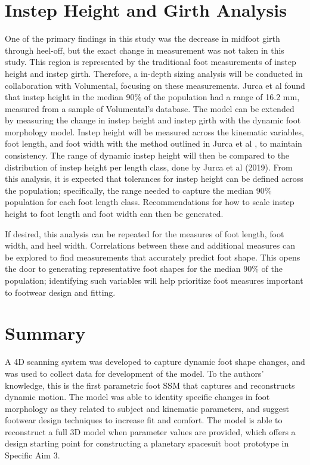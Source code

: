 \documentclass[defaultstyle,11pt]{comps}
\begin{document}
\hypertarget{instep-height-and-girth-analysis}{%
\section{Instep Height and Girth Analysis}\label{instep-height-and-girth-analysis}}

One of the primary findings in this study was the decrease in midfoot girth through heel-off, but the exact change in measurement was not taken in this study.
This region is represented by the traditional foot measurements of instep height and instep girth.
Therefore, a in-depth sizing analysis will be conducted in collaboration with Volumental, focusing on these measurements.
Jurca et al \citep{Jurca2019} found that instep height in the median 90\% of the population had a range of 16.2 mm, measured from a sample of Volumental's database.
The model can be extended by measuring the change in instep height and instep girth with the dynamic foot morphology model.
Instep height will be measured across the kinematic variables, foot length, and foot width with the method outlined in Jurca et al \citep{Jurca2019}, to maintain consistency.
The range of dynamic instep height will then be compared to the distribution of instep height per length class, done by Jurca et al (2019).
From this analysis, it is expected that tolerances for instep height can be defined across the population; specifically, the range needed to capture the median 90\% population for each foot length class.
Recommendations for how to scale instep height to foot length and foot width can then be generated.

If desired, this analysis can be repeated for the measures of foot length, foot width, and heel width. Correlations between these and additional measures can be explored to find measurements that accurately predict foot shape. This opens the door to generating representative foot shapes for the median 90\% of the population; identifying such variables will help prioritize foot measures important to footwear design and fitting.

\hypertarget{summary-3}{%
\section{Summary}\label{summary-3}}

A 4D scanning system was developed to capture dynamic foot shape changes, and was used to collect data for development of the model.
To the authors' knowledge, this is the first parametric foot SSM that captures and reconstructs dynamic motion.
The model was able to identity specific changes in foot morphology as they related to subject and kinematic parameters, and suggest footwear design techniques to increase fit and comfort.
The model is able to reconstruct a full 3D model when parameter values are provided, which offers a design starting point for constructing a planetary spacesuit boot prototype in Specific Aim 3.
\end{document}

